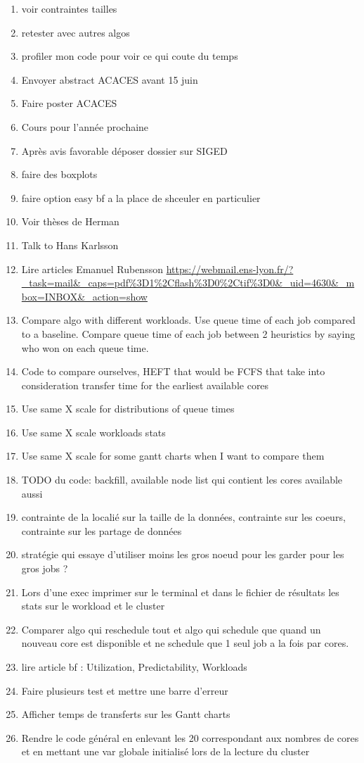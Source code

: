 \documentclass[a4paper]{article}
\begin{document}
\begin{enumerate}
		
			\item voir contraintes tailles
			\item retester avec autres algos
			\item profiler mon code pour voir ce qui coute du temps
			\item Envoyer abstract ACACES avant 15 juin
			\item Faire poster ACACES
			\item Cours pour l'année prochaine
			\item Après avis favorable déposer dossier sur SIGED
			\item faire des boxplots
			\item faire option easy bf a la place de shceuler en particulier
			\item Voir thèses de Herman
			\item Talk to Hans Karlsson
			\item Lire articles Emanuel Rubensson \url{https://webmail.ens-lyon.fr/?_task=mail&_caps=pdf%3D1%2Cflash%3D0%2Ctif%3D0&_uid=4630&_mbox=INBOX&_action=show}
			\item Compare algo with different workloads. Use queue time of each job compared to a baseline. Compare queue time of each job between 2 heuristics by saying who won on each queue time.
			\item Code to compare ourselves, HEFT that would be FCFS that take into consideration transfer time for the earliest available cores
			\item Use same X scale for distributions of queue times
			\item Use same X scale workloads stats
			\item Use same X scale for some gantt charts when I want to compare them
			\item TODO du code: backfill, available node list qui contient les cores available aussi
			\item contrainte de la localié sur la taille de la données, contrainte sur les coeurs, contrainte sur les partage de données
			\item stratégie qui essaye d'utiliser moins les gros noeud pour les garder pour les gros jobs ?
			\item Lors d'une exec imprimer sur le terminal et dans le fichier de résultats les stats sur le workload et le cluster
			\item Comparer algo qui reschedule tout et algo qui schedule que quand un nouveau core est disponible et ne schedule que 1 seul job a la fois par cores.
			\item lire article bf : Utilization, Predictability, Workloads
			\item Faire plusieurs test et mettre une barre d'erreur
			\item Afficher temps de transferts sur les Gantt charts
			\item Rendre le code général en enlevant les 20 correspondant aux nombres de cores et en mettant une var globale initialisé lors de la lecture du cluster
		\end{enumerate}
\end{document}
